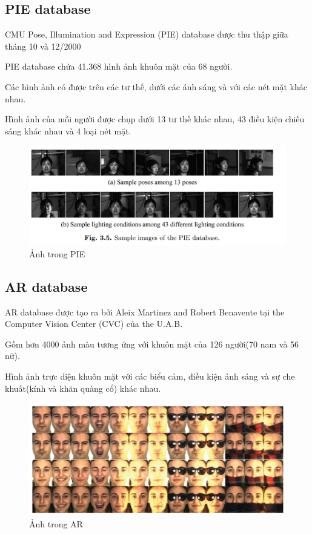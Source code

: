 \documentclass[a4paper, 12pt]{article}
\begin{document}
\subsection{PIE database}
CMU Pose, Illumination and Expression (PIE) database được thu thập giữa tháng 10 và 12/2000

PIE database chứa 41.368 hình ảnh khuôn mặt của 68 người.

Các hình ảnh có được trên các tư thế, dưới các ánh sáng và với các nét mặt khác nhau. 

Hình ảnh của mỗi người được chụp dưới 13 tư thế khác nhau, 43 điều kiện chiếu sáng khác nhau và 4 loại nét mặt.

    \begin{figure}[H]
        \begin{center}
            \includegraphics[scale=0.5]{img/PIE.png}
            \caption{Ảnh trong PIE}
        \end{center}
    \end{figure}

\subsection{AR database}
AR database được tạo ra bởi Aleix Martinez and Robert Benavente tại the Computer Vision Center (CVC) của the U.A.B.

Gồm hơn 4000 ảnh màu tương ứng với khuôn mặt của 126 người(70 nam và 56 nữ). 

Hình ảnh trực diện khuôn mặt với các biểu cảm, điều kiện ảnh sáng và sự che khuất(kính và khăn quàng cổ) khác nhau.

    \begin{figure}[H]
        \begin{center}
            \includegraphics[scale=0.5]{img/AR.png}
            \caption{Ảnh trong AR}
        \end{center}
    \end{figure}
\end{document}
